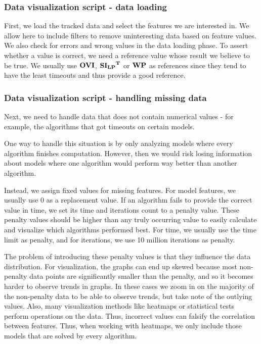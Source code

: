 \subsubsection*{Data visualization script - data loading}
First, we load the tracked data and select the features we are interested in. We allow here to include filters to remove uninteresting data based on feature values.
We also check for errors and wrong values in the data loading phase. To assert whether a value is correct, we need a reference value whose result we believe to be true.
We usually use $\mathbf{OVI}$, $\mathbf{\mathbf{SI_{LP}}^T}$ or $\mathbf{WP}$ as references since they tend to have the least timeouts and thus provide a good reference.

\subsubsection*{Data visualization script - handling missing data}
Next, we need to handle data that does not contain numerical values - for example, the algorithms that got timeouts on certain models.

One way to handle this situation is by only analyzing models where every algorithm finishes computation.
However, then we would risk losing information about models where one algorithm would perform way better than another algorithm.

Instead, we assign fixed values for missing features. For model features, we usually use 0 as a replacement value. 
If an algorithm fails to provide the correct value in time, we set its time and iterations count to a penalty value.
These penalty values should be higher than any truly occurring value to easily calculate and visualize which algorithms performed best.
For time, we usually use the time limit as penalty, and for iterations, we use 10 million iterations as penalty.

The problem of introducing these penalty values is that they influence the data distribution.
For visualization, the graphs can end up skewed because most non-penalty data points are significantly smaller than the penalty, 
and so it becomes harder to observe trends in graphs. In these cases we zoom in on the majority of the non-penalty data to be able to observe trends,
but take note of the outlying values.
Also, many visualization methods like heatmaps or statistical tests perform operations on the
data. Thus, incorrect values can falsify the correlation between features. 
Thus, when working with heatmaps, we only include those models that are solved by every algorithm.